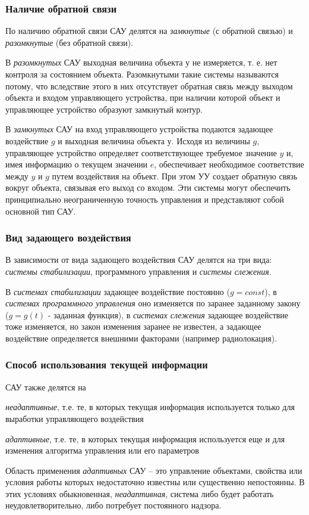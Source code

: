 \documentclass[TAU.tex]{subfiles}
\begin{document}
\subsubsection{Наличие обратной связи}
По наличию обратной связи САУ делятся на {\it замкнутые} (с обратной связью) и {\it разомкнутые} (без обратной связи).\par
В {\it разомкнутых} САУ выходная величина объекта у не измеряется, т. е. нет контроля за состоянием объекта. Разомкнутыми такие системы называются потому, что вследствие этого в них отсутствует обратная связь между выходом объекта и входом управляющего устройства, при наличии которой объект и управляющее устройство образуют замкнутый контур. \par
В {\it замкнутых} САУ на вход управляющего устройства подаются задающее воздействие $g$ и выходная величина объекта $у$. Исходя из величины $g$, управляющее устройство определяет соответствующее требуемое значение $y$ и, имея информацию о текущем значении $e$, обеспечивает необходимое соответствие между $y$ и $g$ путем воздействия на объект. При этом УУ создает обратную связь вокруг объекта, связывая его выход со входом. Эти системы могут обеспечить принципиально неограниченную точность управления и представляют собой основной тип САУ. 

\subsubsection{Вид задающего воздействия}
В зависимости от вида задающего воздействия САУ делятся на три вида: {\it системы стабилизации}, { программного управления} и {\it системы слежения}. \par
В {\it системах стабилизации} задающее воздействие постоянно ($g = const$), в {\it системах программного управления} оно изменяется по заранее заданному закону ($g = g(t)$ - заданная функция), в {\it системах слежения} задающее воздействие тоже изменяется, но закон изменения заранее не известен, а задающее воздействие определяется внешними факторами (например радиолокация).

\subsubsection{Способ использования текущей информации}
САУ также делятся на \par
{\it неадаптивные}, т.е.  те, в которых текущая информация используется только для выработки управляющего воздействия \par
{\it адаптивные}, т.е. те, в которых текущая информация используется еще и для изменения алгоритма управления или его параметров\\\par
Область применения {\it адаптивных} САУ – это управление объектами, свойства или условия работы которых недостаточно известны или существенно непостоянны. В этих условиях обыкновенная, {\it неадаптивная}, система либо будет работать неудовлетворительно, либо потребует постоянного надзора. 
\end{document}
